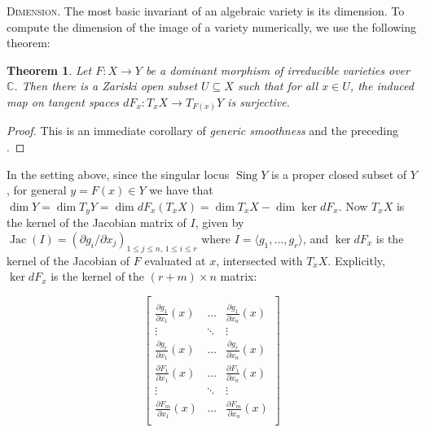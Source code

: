 \documentclass[letter]{amsart}
\newtheorem{theorem}[prop]{Theorem}
\theoremstyle{definition}
\begin{document}
\noindent
\textsc{Dimension.} The most basic invariant of an algebraic variety is its dimension. To compute the dimension of the image of a variety numerically, we use the following theorem:

\begin{theorem} Let $F : X \rightarrow Y$ be a dominant morphism of irreducible varieties over ${\mathbb{C}}$. Then there is a Zariski open subset $U \subseteq X$ such that for all $x \in U$, the induced map on tangent spaces $dF_x : T_xX \to T_{F(x)}Y$ is surjective. 
\end{theorem} \label{dimThm}

\vspace{-0.8em}

\begin{proof}
This is an immediate corollary of \textit{generic smoothness} \cite[III.10.5]{Har} and the preceding \cite[III.10.4]{Har}.
\end{proof}

In the setting above, since the singular locus $\operatorname{Sing} Y$ is a proper closed subset of $Y$, for general $y = F(x) \in Y$ we
have that $\dim Y = \dim T_yY = \dim dF_x(T_xX) = \dim T_xX - \dim \ker dF_x$. Now $T_xX$ is the kernel of the Jacobian
matrix of $I$, given by $ \operatorname{Jac}(I) = \left(\partial g_i /\partial x_j \right)_{1 \le j \le n, \, 1 \le i \le r}$ where $I = \langle g_1, \ldots, g_r \rangle $, and $\ker dF_x$ is the kernel of the
 Jacobian of $F$ evaluated at $x$, intersected with $T_xX$.  Explicitly, $\ker dF_x$ is the kernel of the $(r+m) \times n$ matrix:

\begin{scriptsize}
\[
\begin{bmatrix}\\[-5.58pt]
\frac{\partial g_1}{\partial x_1}(x) & \ldots & \frac{\partial g_1}{\partial x_n}(x) \\[2pt]
\vdots & \ddots & \vdots \\[2pt]
\frac{\partial g_r}{\partial x_1}(x) & \ldots & \frac{\partial g_r}{\partial x_n}(x) \\[8pt]
\frac{\partial F_1}{\partial x_1}(x) & \ldots & \frac{\partial F_1}{\partial x_n}(x) \\[2pt]
\vdots & \ddots & \vdots \\[2pt]
\frac{\partial F_m}{\partial x_1}(x) & \ldots & \frac{\partial F_m}{\partial x_n}(x) \\[5pt]
\end{bmatrix}
\]
\end{scriptsize}
\end{document}
